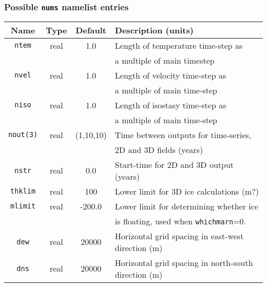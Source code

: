 \documentclass[11pt]{article}
\begin{document}
\subsubsection{Possible \texttt{nums} namelist entries}
%
\begin{center}
\begin{tabular}{|c|c|c|l|}
\hline
Name & Type & Default & Description (units)\\
\hline
\hline
\texttt{ntem}    & real & 1.0 & Length of temperature time-step as \\
 & & & a multiple of main timestep \\
\hline
\texttt{nvel}    & real & 1.0 & Length of velocity time-step as \\
 & & & a multiple of main time-step\\
\hline
\texttt{niso}    & real & 1.0 & Length of isostasy time-step as \\
 & & & a multiple of main time-step\\
\hline
\texttt{nout(3)} & real & (1,10,10) & Time between outputs for time-series, \\
 & & & 2D and 3D fields (years)\\
\hline
\texttt{nstr}    & real & 0.0 & Start-time for 2D and 3D output (years) \\
\hline
\texttt{thklim} & real & 100 & Lower limit for 3D ice calculations (m?) \\
\hline
\texttt{mlimit} & real & -200.0 & Lower limit for determining whether ice  \\
 & & & is floating, used when \texttt{whichmarn}=0. \\
\hline
\texttt{dew} & real & 20000 & Horizontal grid spacing in east-west direction (m)
\\
\hline
\texttt{dns} & real & 20000 & Horizontal grid spacing in north-south direction (m) \\
\hline
\end{tabular}
\end{center}
%
\end{document}

